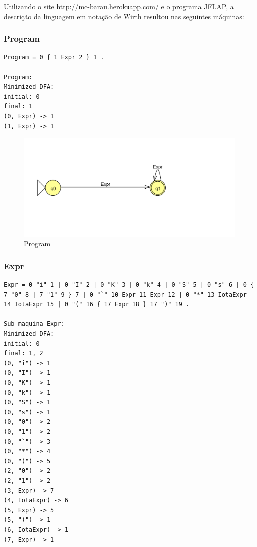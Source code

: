 Utilizando o site http://mc-barau.herokuapp.com/ e o programa JFLAP, a descrição da linguagem em notação de Wirth resultou nas seguintes máquinas:

\subsubsection{Program}

\begin{lstlisting}
Program = 0 { 1 Expr 2 } 1 .

Program: 
Minimized DFA: 
initial: 0
final: 1
(0, Expr) -> 1
(1, Expr) -> 1       
\end{lstlisting}

\begin{figure}[H]
\centering
\includegraphics[width=15cm,keepaspectratio]{jflap-automatas/program.png}
\caption{\label{fig:jflap-program} Program}
\end{figure}

\subsubsection{Expr}

\begin{lstlisting}  
Expr = 0 "i" 1 | 0 "I" 2 | 0 "K" 3 | 0 "k" 4 | 0 "S" 5 | 0 "s" 6 | 0 { 7 "0" 8 | 7 "1" 9 } 7 | 0 "`" 10 Expr 11 Expr 12 | 0 "*" 13 IotaExpr 14 IotaExpr 15 | 0 "(" 16 { 17 Expr 18 } 17 ")" 19 .
                   
Sub-maquina Expr: 
Minimized DFA: 
initial: 0
final: 1, 2
(0, "i") -> 1
(0, "I") -> 1
(0, "K") -> 1
(0, "k") -> 1
(0, "S") -> 1
(0, "s") -> 1
(0, "0") -> 2
(0, "1") -> 2
(0, "`") -> 3
(0, "*") -> 4
(0, "(") -> 5
(2, "0") -> 2
(2, "1") -> 2
(3, Expr) -> 7
(4, IotaExpr) -> 6
(5, Expr) -> 5
(5, ")") -> 1
(6, IotaExpr) -> 1
(7, Expr) -> 1
\end{lstlisting}

